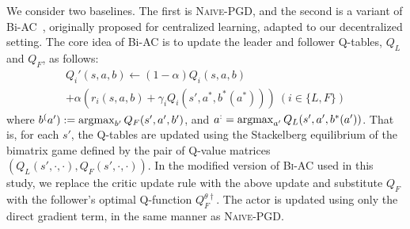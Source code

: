 \documentclass[letterpaper]{article} %
\providecommand{\argmax}{\operatornamewithlimits{argmax}} %
\begin{document}

We consider two baselines.
The first is \textsc{Naive-PGD}, and the second is a variant of Bi-AC~\cite{Zhang2020-hw}, originally proposed for centralized learning, adapted to our decentralized setting.
The core idea of Bi-AC is to update the leader and follower Q-tables, $Q_L$ and $Q_F$, as follows:
\begin{multline*}
Q_i'(s, a, b) \gets (1 - \alpha)  Q_i(s, a, b)\\+ \alpha (r_i(s, a, b) + \gamma_i Q_i(s', a^*, b^*(a^*)))~(i\in\{L,F\})
\end{multline*}
where
$b^(a') := \argmax_{b'} Q_F(s', a', b')$,
and
$a^ := \argmax_{a'} Q_L(s', a', b^*(a'))$.
That is, for each $s'$, the Q-tables are updated using the Stackelberg equilibrium of the bimatrix game defined by the pair of Q-value matrices
$(Q_L(s', \cdot, \cdot), Q_F(s', \cdot, \cdot))$.
In the modified version of \textsc{Bi-AC} used in this study, we replace the critic update rule with the above update and substitute $Q_F$ with the follower's optimal Q-function $Q_F^{\theta\dag}$.
The actor is updated using only the direct gradient term, in the same manner as \textsc{Naive-PGD}.
\end{document}
